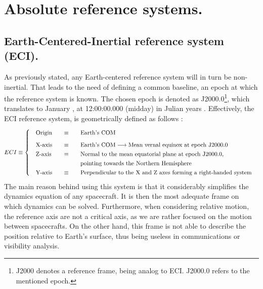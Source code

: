 \section{Absolute reference systems.}
%
	\subsection{Earth-Centered-Inertial reference system (ECI).}
	\indent As previously stated, any Earth-centered reference system will in turn be non-inertial. That leads to the need of defining a common baseline, \ie an epoch at which the reference system is known. The chosen epoch is denoted as J2000.0\footnote{J2000 denotes a reference frame, being analog to ECI. J2000.0 refers to the mentioned epoch.}, which translates to January , at 12:00:00.000 (midday) in Julian years \cite[see][, glossary]{Time_handbook}. Effectively, the ECI reference system, is geometrically defined as follows \cite{Tapley}:
	\[
	\arraycolsep=10pt
	\def\arraystretch{1.3}
	ECI \equiv\left\{
	\begin{array}{lll}
	\text{Origin} 	& \equiv 	& \text{Earth's COM} \\[0.5 em]
	\text{X-axis} 	& \equiv 	& \text{Earth's COM} \longrightarrow \text{Mean vernal equinox at epoch J2000.0} \\
	\text{Z-axis} 	& \equiv 	& \text{Normal to the mean equatorial plane at epoch J2000.0, } \\
	  				& 			& \text{pointing towards the Northern Hemisphere} \\
	\text{Y-axis} 	& \equiv 	& \text{Perpendicular to the X and Z axes forming a right-handed system} \\
	\end{array}
	\right.
	\]
	\indent The main reason behind using this system is that it considerably simplifies the dynamics equation of any spacecraft. It is then the most adequate frame on which dynamics can be solved. Furthermore, when considering relative motion, the reference axis are not a critical axis, as we are rather focused on the motion between spacecrafts. On the other hand, this frame is not able to describe the position relative to Earth's surface, thus being useless in communications or visibility analysis.
